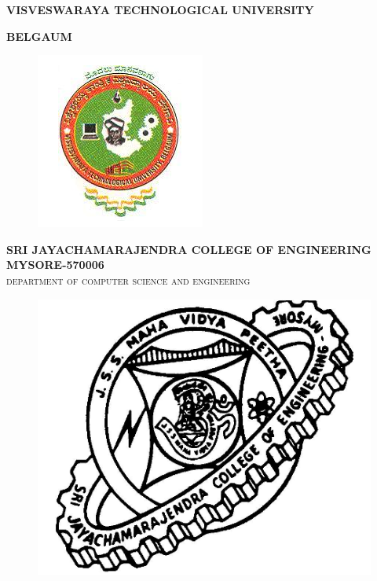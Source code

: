 \documentclass[12pt, oneside, a4paper]{article}
\begin{document}
\begin{center}
\textbf{VISVESWARAYA TECHNOLOGICAL UNIVERSITY}
\end{center}
\begin{center}
\textbf{BELGAUM}\\
\thispagestyle{empty}
\begin{figure}[htb]
\begin{center}
\ifpdf
	\includegraphics[scale=0.50]{vtu.png}
\else
\fi
\end{center}
\end{figure}
\textbf{SRI JAYACHAMARAJENDRA COLLEGE OF ENGINEERING}
\textbf{MYSORE-570006}\\
\textsc{department of computer science and engineering}
\end{center}
\begin{figure}[htb]
\begin{center}
\ifpdf
\includegraphics[scale=0.30]{./logo.png}
\else
\fi
\end{center}
\end{figure}
\end{document}
